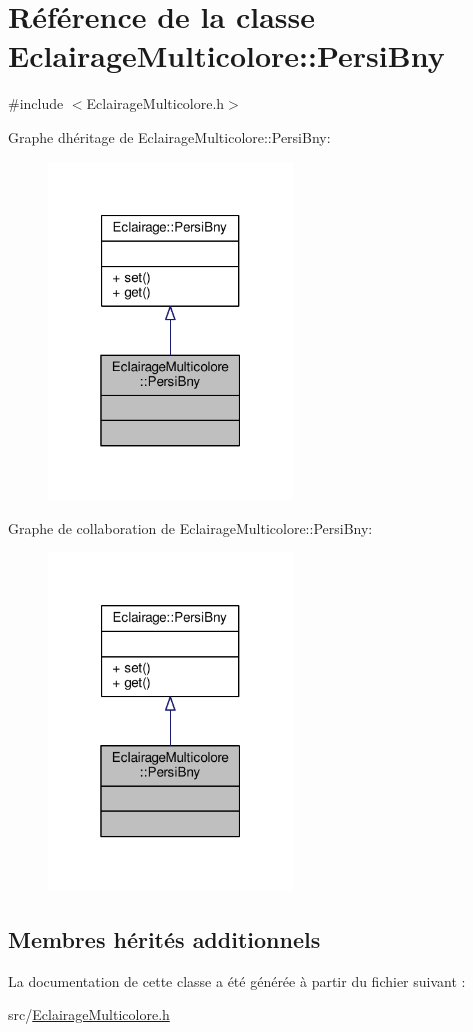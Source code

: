 \hypertarget{classEclairageMulticolore_1_1PersiBny}{}\section{Référence de la classe Eclairage\+Multicolore\+:\+:Persi\+Bny}
\label{classEclairageMulticolore_1_1PersiBny}


{\ttfamily \#include $<$Eclairage\+Multicolore.\+h$>$}



Graphe d\textquotesingle{}héritage de Eclairage\+Multicolore\+:\+:Persi\+Bny\+:\nopagebreak
\begin{figure}[H]
\begin{center}
\leavevmode
\includegraphics[width=184pt]{classEclairageMulticolore_1_1PersiBny__inherit__graph}
\end{center}
\end{figure}


Graphe de collaboration de Eclairage\+Multicolore\+:\+:Persi\+Bny\+:\nopagebreak
\begin{figure}[H]
\begin{center}
\leavevmode
\includegraphics[width=184pt]{classEclairageMulticolore_1_1PersiBny__coll__graph}
\end{center}
\end{figure}
\subsection*{Membres hérités additionnels}


La documentation de cette classe a été générée à partir du fichier suivant \+:\begin{DoxyCompactItemize}
\item 
src/\hyperlink{EclairageMulticolore_8h}{Eclairage\+Multicolore.\+h}\end{DoxyCompactItemize}
